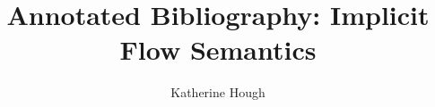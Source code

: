 \documentclass{article}
\begin{document}
	\title{Annotated Bibliography: Implicit Flow Semantics}
	\author{Katherine Hough}
	\maketitle\nocite{*}
	
	
\end{document}
